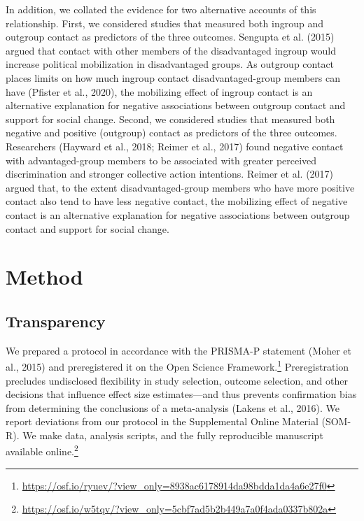 \documentclass[twocolumn, 11pt, letterpaper]{article}
\begin{document}
In addition, we collated the evidence for two alternative accounts of
this relationship. First, we considered studies that measured both
ingroup and outgroup contact as predictors of the three outcomes.
Sengupta et al. (2015) argued that contact with other members of the
disadvantaged ingroup would increase political mobilization in
disadvantaged groups. As outgroup contact places limits on how much
ingroup contact disadvantaged-group members can have (Pfister et al.,
2020), the mobilizing effect of ingroup contact is an alternative
explanation for negative associations between outgroup contact and
support for social change. Second, we considered studies that measured
both negative and positive (outgroup) contact as predictors of the three
outcomes. Researchers (Hayward et al., 2018; Reimer et al., 2017) found
negative contact with advantaged-group members to be associated with
greater perceived discrimination and stronger collective action
intentions. Reimer et al. (2017) argued that, to the extent
disadvantaged-group members who have more positive contact also tend to
have less negative contact, the mobilizing effect of negative contact is
an alternative explanation for negative associations between outgroup
contact and support for social change.

\hypertarget{method}{%
\section{Method}\label{method}}

\hypertarget{transparency}{%
\subsection{Transparency}\label{transparency}}

We prepared a protocol in accordance with the PRISMA-P statement (Moher
et al., 2015) and preregistered it on the Open Science
Framework.\footnote{\url{https://osf.io/ryuev/?view_only=8938ac6178914da98bdda1da4a6e27f0}}
Preregistration precludes undisclosed flexibility in study selection,
outcome selection, and other decisions that influence effect size
estimates---and thus prevents confirmation bias from determining the
conclusions of a meta-analysis (Lakens et al., 2016). We report
deviations from our protocol in the Supplemental Online Material
(SOM-R). We make data, analysis scripts, and the fully reproducible
manuscript available online.\footnote{\url{https://osf.io/w5tqv/?view_only=5cbf7ad5b2b449a7a0f4ada0337b802a}}
\end{document}
